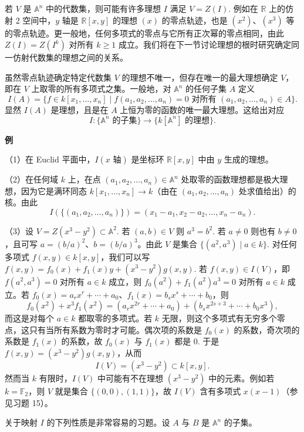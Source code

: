 若 \(V\) 是 \(\mathbb{A}^n\) 中的代数集，则可能有许多理想 \(I\) 满足 \(V = Z(I)\). 例如在 \(\mathbb{R}\) 上的仿射 2 空间中，\(y\) 轴是 \(\mathbb{R}[x,y]\) 的理想 \((x)\) 的零点轨迹，也是 \((x^2)\)、\((x^3)\) 等的零点轨迹。更一般地，任何多项式的零点与它所有正次幂的零点相同，由此 \(Z(I) = Z(I^k)\) 对所有 \(k \geq 1\) 成立。我们将在下一节讨论理想的根时研究确定同一仿射代数集的理想之间的关系。

虽然零点轨迹确定特定代数集 \(V\) 的理想不唯一，但存在唯一的最大理想确定 \(V\)，即在 \(V\) 上取零的所有多项式之集。一般地，对 \(\mathbb{A}^n\) 的任何子集 \(A\) 定义
\[
I(A) = \{f \in k[x_1, \ldots, x_n] \mid f(a_1, a_2, \ldots, a_n) = 0 \text{ 对所有 } (a_1, a_2, \ldots, a_n) \in A\}.
\]
显然 \(I(A)\) 是理想，且是在 \(A\) 上恒为零的函数的唯一最大理想。这给出对应
\[
I : \{\mathbb{A}^n \text{ 的子集}\} \to \{k[\mathbb{A}^n] \text{ 的理想}\}.
\]

\noindent\textbf{例}

（1）在 Euclid 平面中，\(I(x\text{ 轴})\) 是坐标环 \(\mathbb{R}[x,y]\) 中由 \(y\) 生成的理想。

（2）在任何域 \(k\) 上，在点 \((a_1, a_2, \ldots, a_n) \in \mathbb{A}^n\) 处取零的函数理想都是极大理想，因为它是满环同态 \(k[x_1, \ldots, x_n] \to k\)（由在 \((a_1, a_2, \ldots, a_n)\) 处求值给出）的核。由此
\[
I(\{(a_1, a_2, \ldots, a_n)\}) = (x_1-a_1, x_2-a_2, \ldots, x_n-a_n).
\]

（3）设 \(V = Z(x^3-y^2) \subset \mathbb{A}^2\). 若 \((a,b) \in V\) 则 \(a^3 = b^2\). 若 \(a \neq 0\) 则也有 \(b \neq 0\)，且可写 \(a = (b/a)^2\)、\(b = (b/a)^3\)。由此 \(V\) 是集合 \(\{(a^2, a^3) \mid a \in k\}\). 对任何多项式 \(f(x,y) \in k[x,y]\)，我们可以写 \(f(x,y) = f_0(x)+f_1(x)y+(x^3-y^2)g(x,y)\). 若 \(f(x,y) \in I(V)\)，即 \(f(a^2,a^3) = 0\) 对所有 \(a \in k\) 成立，则 \(f_0(a^2)+f_1(a^2)a^3 = 0\) 对所有 \(a \in k\) 成立。若 \(f_0(x) = a_rx^r+\cdots+a_0\)、\(f_1(x) = b_sx^s+\cdots+b_0\)，则
\[
f_0(x^2)+x^3f_1(x^2) = (a_rx^{2r}+\cdots+a_0)+(b_sx^{2s+3}+\cdots+b_0x^3),
\]
而这是对每个 \(a \in k\) 都取零的多项式。若 \(k\) 无限，则这个多项式有无穷多个零点，这只有当所有系数为零时才可能。偶次项的系数是 \(f_0(x)\) 的系数，奇次项的系数是 \(f_1(x)\) 的系数，故 \(f_0(x)\) 与 \(f_1(x)\) 都是 0. 于是 \(f(x,y) = (x^3-y^2)g(x,y)\)，从而
\[
I(V) = (x^3-y^2) \subset k[x,y].
\]
然而当 \(k\) 有限时，\(I(V)\) 中可能有不在理想 \((x^3-y^2)\) 中的元素。例如若 \(k = \mathbb{F}_2\)，则 \(V\) 就是集合 \(\{(0,0), (1,1)\}\)，故 \(I(V)\) 含有多项式 \(x(x-1)\)（参见习题 15）。

关于映射 \(I\) 的下列性质是非常容易的习题。设 \(A\) 与 \(B\) 是 \(\mathbb{A}^n\) 的子集。

